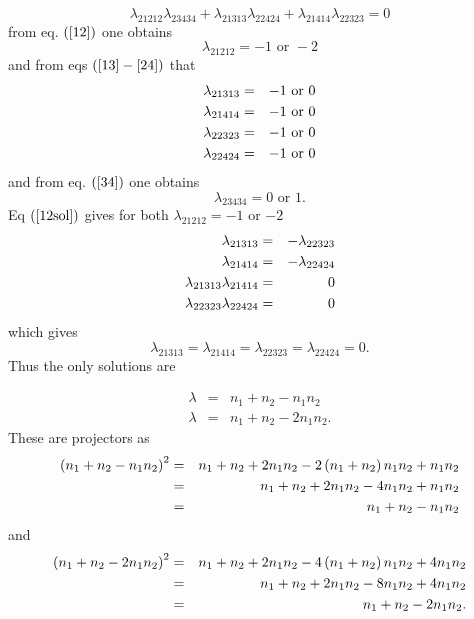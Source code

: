 \documentclass[12pt]{article}
\begin{document}
\begin{equation}
\lambda _{21212}\lambda _{23434}+\lambda _{21313}\lambda _{22424}+\lambda
_{21414}\lambda _{22323}=0
\end{equation}%
from eq. $\left( \ref{12}\right) $ one obtains 
\begin{equation}
\lambda _{21212}=-1\text{ or }-2  \label{12sol}
\end{equation}%
and from eqs $\left( \ref{13}-\ref{24}\right) $ that 
\begin{eqnarray}
\lambda _{21313} &=&-1\text{ or }0  \notag \\
\lambda _{21414} &=&-1\text{ or }0  \notag \\
\lambda _{22323} &=&-1\text{ or }0  \notag \\
\lambda _{22424} &=&-1\text{ or }0
\end{eqnarray}%
and from eq. $\left( \ref{34}\right) $ one obtains%
\begin{equation}
\lambda _{23434}=0\text{ or }1.
\end{equation}%
Eq $\left( \ref{12sol}\right) $ gives for both $\lambda _{21212}=-1$ or $-2$ 
\begin{eqnarray}
\lambda _{21313} &=&-\lambda _{22323}  \notag \\
\lambda _{21414} &=&-\lambda _{22424}  \notag \\
\lambda _{21313}\lambda _{21414} &=&0  \notag \\
\lambda _{22323}\lambda _{22424} &=&0
\end{eqnarray}%
which gives 
\begin{equation}
\lambda _{21313}=\lambda _{21414}=\lambda _{22323}=\lambda _{22424}=0.
\end{equation}%
Thus the only solutions are

\bigskip 
\begin{eqnarray}
\lambda &=&n_{1}+n_{2}-n_{1}n_{2} \\
\lambda &=&n_{1}+n_{2}-2n_{1}n_{2}.
\end{eqnarray}%
These are projectors as 
\begin{eqnarray}
\left( n_{1}+n_{2}-n_{1}n_{2}\right) ^{2} &=&n_{1}+n_{2}+2n_{1}n_{2}-2\left(
n_{1}+n_{2}\right) n_{1}n_{2}+n_{1}n_{2}  \notag \\
&=&n_{1}+n_{2}+2n_{1}n_{2}-4n_{1}n_{2}+n_{1}n_{2}  \notag \\
&=&n_{1}+n_{2}-n_{1}n_{2}
\end{eqnarray}%
and 
\begin{eqnarray}
\left( n_{1}+n_{2}-2n_{1}n_{2}\right) ^{2}
&=&n_{1}+n_{2}+2n_{1}n_{2}-4\left( n_{1}+n_{2}\right) n_{1}n_{2}+4n_{1}n_{2}
\notag \\
&=&n_{1}+n_{2}+2n_{1}n_{2}-8n_{1}n_{2}+4n_{1}n_{2}  \notag \\
&=&n_{1}+n_{2}-2n_{1}n_{2}.
\end{eqnarray}
\end{document}
